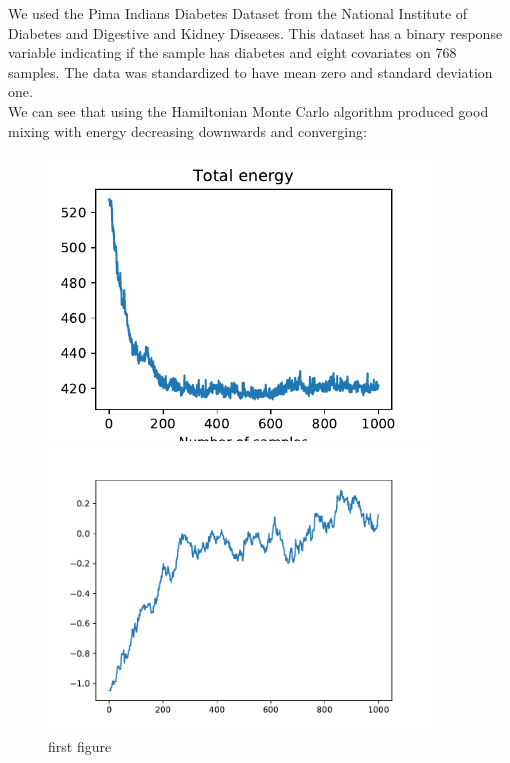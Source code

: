 We used the Pima Indians Diabetes Dataset from the National Institute of Diabetes and Digestive and Kidney Diseases. This dataset has a binary response variable indicating if the sample has diabetes and eight covariates on 768 samples. The data was standardized to have mean zero and standard deviation one.\\



We can see that using the Hamiltonian Monte Carlo algorithm produced good mixing with energy decreasing downwards and converging:

\begin{figure}[H]
	\centering
	\begin{minipage}{0.45\textwidth}
		\centering
		\includegraphics[width=0.9\textwidth]{hmc-energy-pima.pdf} %
		\caption{first figure}
	\end{minipage}\hfill
	\begin{minipage}{0.45\textwidth}
		\centering
		\includegraphics[width=0.9\textwidth]{hmc-trace-pima.pdf} %
	\end{minipage}
\end{figure}

